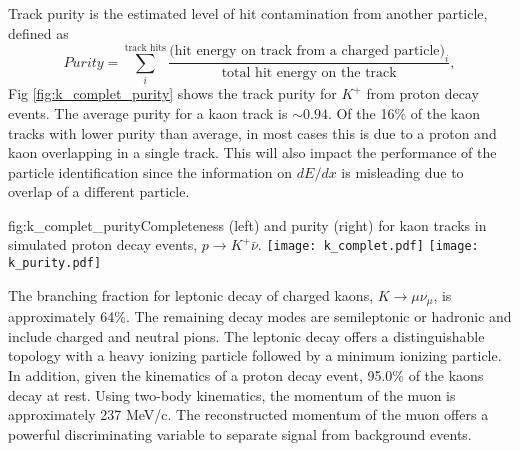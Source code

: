 Track purity is the estimated level of hit contamination from another particle, defined as
\begin{equation}
Purity = \sum_{i}^{\mbox{track hits}}\frac{\mbox{(hit energy on track from a charged particle)}_{i}}{\mbox{total hit energy on the track}},
\end{equation}
Fig \ref{fig:k_complet_purity} shows the track purity for $K^{+}$ from proton decay events. The average purity for a kaon track is $\sim0.94$. Of the 16$\%$ of the kaon tracks with lower purity than average, in most cases this is due to a proton and kaon overlapping in a single track. This will also impact the performance of the particle identification since the information on $dE/dx$ is misleading due to overlap of a different particle. 

\begin{dunefigure}{fig:k_complet_purity}{Completeness (left) and purity (right) for kaon tracks in simulated proton decay events, $p\rightarrow K^{+} \bar{\nu}$.}
\texttt{[image: k\_complet.pdf]}
\texttt{[image: k\_purity.pdf]}
\end{dunefigure}

The branching fraction for leptonic decay of charged kaons, $K\rightarrow \mu \nu_{\mu}$, is approximately 64$\%$. The remaining decay modes are semileptonic or hadronic and include charged and neutral pions. The leptonic decay offers a distinguishable topology with a heavy ionizing particle followed by a minimum ionizing particle. In addition, given the kinematics of a proton decay event, 95.0$\%$ of the kaons decay at rest. Using two-body kinematics, the momentum of the muon is approximately 237 MeV/c. The reconstructed momentum of the muon offers a powerful discriminating variable to separate signal from background events. 

